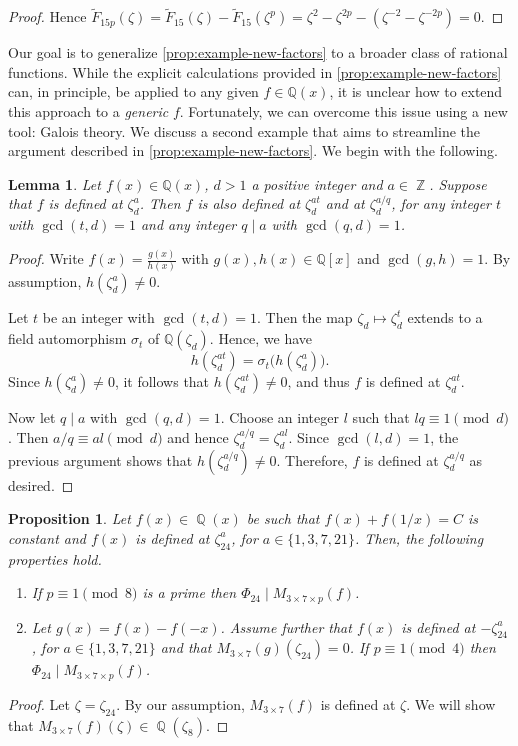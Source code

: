 \documentclass[12t,a4paper]{amsart}
\newtheorem{prop}[thm]{Proposition}
\newtheorem{lem}[thm]{Lemma}
\theoremstyle{definition}
\DeclareMathOperator{\Z}{\mathbb{Z}}
\DeclareMathOperator{\Q}{\mathbb{Q}}
\numberwithin{equation}{section}
\begin{document}
{\begin{proof}
Hence $\tilde{F}_{15p}(\zeta)=\tilde{F}_{15}(\zeta)-\tilde{F}_{15}(\zeta^p)=\zeta^2-\zeta^{2p}-(\zeta^{-2}-\zeta^{-2p})=0$.
\end{proof}


Our goal is to generalize \cref{prop:example-new-factors} to a broader class of rational functions. While the explicit calculations provided in \cref{prop:example-new-factors} can, in principle, be applied to any given $f \in \mathbb{Q}(x)$, it is unclear how to extend this approach to a \textit{generic} $f$. Fortunately, we can overcome this issue using a new tool: Galois theory. We discuss a second example that aims to streamline the argument described in \cref{prop:example-new-factors}. We begin with the following.%
\begin{lem}\label{lem-defined}
Let $f(x) \in \mathbb{Q}(x)$, $d>1$ a positive integer and $a\in \Z$. 
Suppose that $f$ is defined at $\zeta_d^a$. 
Then $f$ is also defined at $\zeta_d^{at}$ and at $\zeta_d^{a/q}$, 
for any integer $t$ with $\gcd(t,d)=1$ and any integer $q \mid a$ with $\gcd(q,d)=1$.
\end{lem}
\begin{proof}
    Write $f(x) = \frac{g(x)}{h(x)}$ with $g(x), h(x) \in \mathbb{Q}[x]$ and $\gcd(g,h)=1$. 
By assumption, $h(\zeta_d^a) \neq 0$. 

Let $t$ be an integer with $\gcd(t,d)=1.$ Then the map $\zeta_d \mapsto \zeta_d^t$ 
extends to a field automorphism $\sigma_t$ of $\mathbb{Q}(\zeta_d).$
Hence,  we have
\[
h(\zeta_d^{at}) = \sigma_t\big(h(\zeta_d^a)\big).
\]
 Since $h(\zeta_d^a) \neq 0$, 
it follows that $h(\zeta_d^{at}) \neq 0$, and thus $f$ is defined at $\zeta_d^{at}$.

Now let $q \mid a$ with $\gcd(q,d)=1$. Choose an integer $l$ such that 
$lq \equiv 1 \pmod{d}$. Then $a/q\equiv al\pmod d$ and hence $\zeta_d^{a/q} = \zeta_d^{al}$. Since $\gcd(l,d)=1$, 
the previous argument shows that $h(\zeta_d^{a/q}) \neq 0$. Therefore, 
$f$ is defined at $\zeta_d^{a/q}$ as desired.
\end{proof}

\begin{prop} \label{prop:Galois-toy-example}
     Let $f(x)\in \Q(x)$ be  such that $f(x)+f(1/x)=C$ is constant and $f(x)$ is defined at $\zeta_{24}^a$, for $a\in \{1,3,7,21\}$. Then, the following properties hold.
     \begin{enumerate}
  \item[(a)] If $p\equiv 1\pmod 8$ is a prime then $\Phi_{24}\mid M_{3\times 7\times p}(f)$.
  \item[(b)] Let $g(x)=f(x)-f(-x)$. Assume further that $f(x)$ is defined at $-\zeta_{24}^a$, for $a\in \{1,3,7,21\}$ and that $M_{3\times 7}(g)(\zeta_{24})=0$.  If $p\equiv 1\pmod 4$  then $\Phi_{24}\mid M_{3\times 7\times p}(f)$.
  \end{enumerate}
\end{prop}
\begin{proof} Let $\zeta=\zeta_{24}$. By our assumption, $M_{3\times7}(f)$ is defined at $\zeta$. We will show that $M_{3\times 7}(f)(\zeta)\in \Q(\zeta_8)$. 


\end{proof}}
\end{document}
